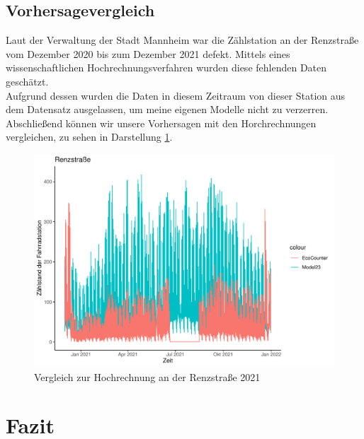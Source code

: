 \documentclass[a4paper,12pt]{thesis}
\begin{document}
\section{Vorhersagevergleich}

Laut der Verwaltung der Stadt Mannheim war die Zählstation an der Renzstraße vom Dezember 2020 bis zum Dezember 2021 defekt. Mittels eines wissenschaftlichen Hochrechnungsverfahren wurden diese fehlenden Daten geschätzt.\\ 
Aufgrund dessen wurden die Daten in diesem Zeitraum von dieser Station aus dem Datensatz ausgelassen, um meine eigenen Modelle nicht zu verzerren. Abschließend können wir unsere Vorhersagen mit den Horchrechnungen vergleichen, zu sehen in Darstellung \ref{Forecast2}.


\begin{figure}[!ht]
	\centering
	\includegraphics[width=\textwidth]{Plots/Renzstrasse.pdf}
	\caption{Vergleich zur Hochrechnung an der Renzstraße 2021}
	\label{Forecast2}
\end{figure}

\chapter{Fazit}
\end{document}
